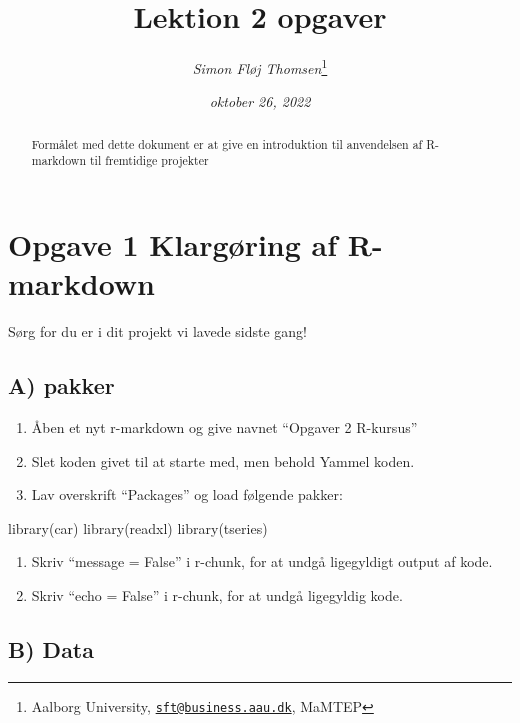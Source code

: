 \documentclass[
  12pt,
]{article}
\title{Lektion 2 opgaver}
\author{\emph{Simon Fløj Thomsen}\footnote{Aalborg University,
  \href{mailto:sft@business.aau.dk}{\nolinkurl{sft@business.aau.dk}},
  MaMTEP}}
\date{\emph{oktober 26, 2022}}
\newenvironment{Shaded}{\begin{snugshade}}{\end{snugshade}}
\newcommand{\FunctionTok}[1]{\textcolor[rgb]{0.00,0.00,0.00}{#1}}
\newcommand{\NormalTok}[1]{#1}
\providecommand{\tightlist}{%
  \setlength{\itemsep}{0pt}\setlength{\parskip}{0pt}}
\begin{document}
\maketitle
\begin{abstract}
\begingroup Formålet med dette dokument er at give en introduktion til
anvendelsen af R-markdown til fremtidige projekter \endgroup
\end{abstract}

\hypertarget{opgave-1-klarguxf8ring-af-r-markdown}{%
\section{Opgave 1 Klargøring af
R-markdown}\label{opgave-1-klarguxf8ring-af-r-markdown}}

Sørg for du er i dit projekt vi lavede sidste gang!

\hypertarget{a-pakker}{%
\subsection{A) pakker}\label{a-pakker}}

\begin{enumerate}
\def\labelenumi{\arabic{enumi}.}
\tightlist
\item
  Åben et nyt r-markdown og give navnet ``Opgaver 2 R-kursus''
\item
  Slet koden givet til at starte med, men behold Yammel koden.
\item
  Lav overskrift ``Packages'' og load følgende pakker:
\end{enumerate}

\begin{Shaded}
\begin{Highlighting}[]
\FunctionTok{library}\NormalTok{(car)}
\FunctionTok{library}\NormalTok{(readxl)}
\FunctionTok{library}\NormalTok{(tseries)}
\end{Highlighting}
\end{Shaded}

\begin{enumerate}
\def\labelenumi{\arabic{enumi}.}
\setcounter{enumi}{3}
\tightlist
\item
  Skriv ``message = False'' i r-chunk, for at undgå ligegyldigt output
  af kode.
\item
  Skriv ``echo = False'' i r-chunk, for at undgå ligegyldig kode.
\end{enumerate}

\hypertarget{b-data}{%
\subsection{B) Data}\label{b-data}}
\end{document}
